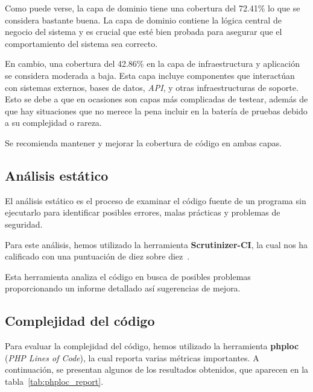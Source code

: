 Como puede verse, la capa de dominio tiene una cobertura del 72.41\% lo que se considera bastante buena.
La capa de dominio contiene la lógica central de negocio del sistema y es crucial que esté bien probada para asegurar
que el comportamiento del sistema sea correcto.

En cambio, una cobertura del 42.86\% en la capa de infraestructura y aplicación se considera moderada a baja.
Esta capa incluye componentes que interactúan con sistemas externos, bases de datos, \textit{API}, y otras
infraestructuras de soporte.
Esto se debe a que en ocasiones son capas más complicadas de testear, además de que hay situaciones que no merece la
pena incluir en la batería de pruebas debido a su complejidad o rareza.

Se recomienda mantener y mejorar la cobertura de código en ambas capas.

\subsection*{Análisis estático}

El análisis estático es el proceso de examinar el código fuente de un programa sin ejecutarlo para identificar posibles
errores, malas prácticas y problemas de seguridad.

Para este análisis, hemos utilizado la herramienta \textbf{Scrutinizer-CI}, la cual nos ha calificado con una puntuación
de diez sobre diez~\cite{url_scrutinizer_viu_84_proyecto}.

Esta herramienta analiza el código en busca de posibles problemas proporcionando un informe detallado así
sugerencias de mejora.

\subsection*{Complejidad del código}

Para evaluar la complejidad del código, hemos utilizado la herramienta \textbf{phploc} (\textit{PHP Lines of Code}), la
cual reporta varias métricas importantes.
A continuación, se presentan algunos de los resultados obtenidos, que aparecen en la tabla~\ref{tab:phploc_report}.

